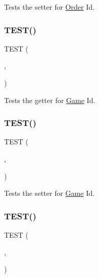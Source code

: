 Tests the setter for \hyperlink{classOrder}{Order} Id. \mbox{\label{group__group2_ga943f547dd9766972f436f99c3e26d7b4}} 
\subsubsection{\texorpdfstring{T\+E\+S\+T()}{TEST()}\hspace{0.1cm}{\footnotesize\ttfamily [40/54]}}
{\footnotesize\ttfamily T\+E\+ST (\begin{DoxyParamCaption}\item[{order\+Test}]{,  }\item[{get\+G\+Id\+Test}]{ }\end{DoxyParamCaption})}

Tests the getter for \hyperlink{classGame}{Game} Id. \mbox{\label{group__group2_ga4f6567cf2ba654f98631644f31ab91dd}} 
\subsubsection{\texorpdfstring{T\+E\+S\+T()}{TEST()}\hspace{0.1cm}{\footnotesize\ttfamily [41/54]}}
{\footnotesize\ttfamily T\+E\+ST (\begin{DoxyParamCaption}\item[{order\+Test}]{,  }\item[{set\+G\+Id\+Test}]{ }\end{DoxyParamCaption})}

Tests the setter for \hyperlink{classGame}{Game} Id. \mbox{\label{group__group2_gace52ab2c1cc4809bd567249a7f4ebb8b}} 
\subsubsection{\texorpdfstring{T\+E\+S\+T()}{TEST()}\hspace{0.1cm}{\footnotesize\ttfamily [42/54]}}
{\footnotesize\ttfamily T\+E\+ST (\begin{DoxyParamCaption}\item[{order\+Test}]{,  }\item[{get\+From\+Player\+Id\+Test}]{ }\end{DoxyParamCaption})}

